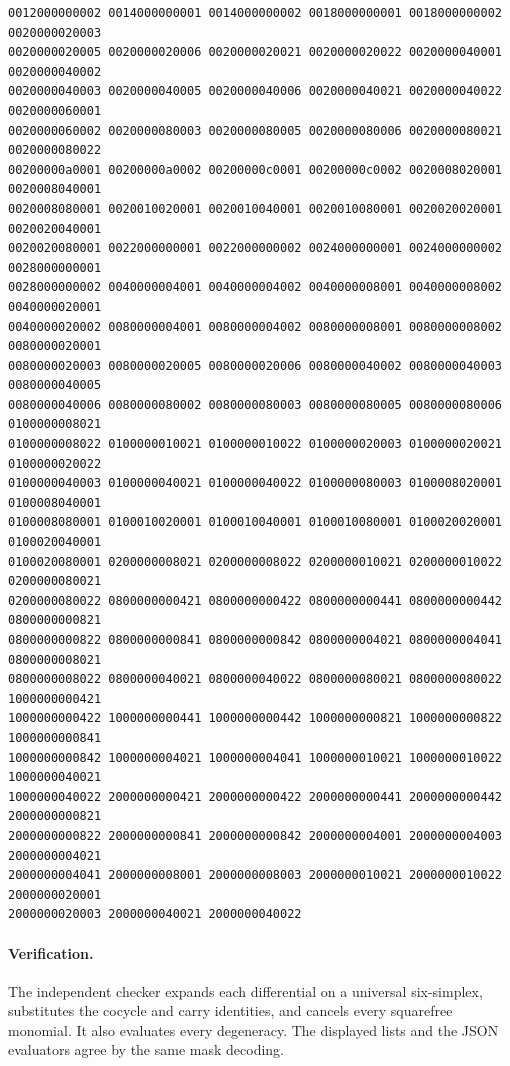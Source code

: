 \begin{Verbatim}[fontsize=\scriptsize]
0012000000002 0014000000001 0014000000002 0018000000001 0018000000002 0020000020003
0020000020005 0020000020006 0020000020021 0020000020022 0020000040001 0020000040002
0020000040003 0020000040005 0020000040006 0020000040021 0020000040022 0020000060001
0020000060002 0020000080003 0020000080005 0020000080006 0020000080021 0020000080022
00200000a0001 00200000a0002 00200000c0001 00200000c0002 0020008020001 0020008040001
0020008080001 0020010020001 0020010040001 0020010080001 0020020020001 0020020040001
0020020080001 0022000000001 0022000000002 0024000000001 0024000000002 0028000000001
0028000000002 0040000004001 0040000004002 0040000008001 0040000008002 0040000020001
0040000020002 0080000004001 0080000004002 0080000008001 0080000008002 0080000020001
0080000020003 0080000020005 0080000020006 0080000040002 0080000040003 0080000040005
0080000040006 0080000080002 0080000080003 0080000080005 0080000080006 0100000008021
0100000008022 0100000010021 0100000010022 0100000020003 0100000020021 0100000020022
0100000040003 0100000040021 0100000040022 0100000080003 0100008020001 0100008040001
0100008080001 0100010020001 0100010040001 0100010080001 0100020020001 0100020040001
0100020080001 0200000008021 0200000008022 0200000010021 0200000010022 0200000080021
0200000080022 0800000000421 0800000000422 0800000000441 0800000000442 0800000000821
0800000000822 0800000000841 0800000000842 0800000004021 0800000004041 0800000008021
0800000008022 0800000040021 0800000040022 0800000080021 0800000080022 1000000000421
1000000000422 1000000000441 1000000000442 1000000000821 1000000000822 1000000000841
1000000000842 1000000004021 1000000004041 1000000010021 1000000010022 1000000040021
1000000040022 2000000000421 2000000000422 2000000000441 2000000000442 2000000000821
2000000000822 2000000000841 2000000000842 2000000004001 2000000004003 2000000004021
2000000004041 2000000008001 2000000008003 2000000010021 2000000010022 2000000020001
2000000020003 2000000040021 2000000040022
\end{Verbatim}
\paragraph{Verification.} The independent checker expands each differential on a universal six-simplex, substitutes the cocycle and carry identities, and cancels every squarefree monomial. It also evaluates every degeneracy. The displayed lists and the JSON evaluators agree by the same mask decoding.
